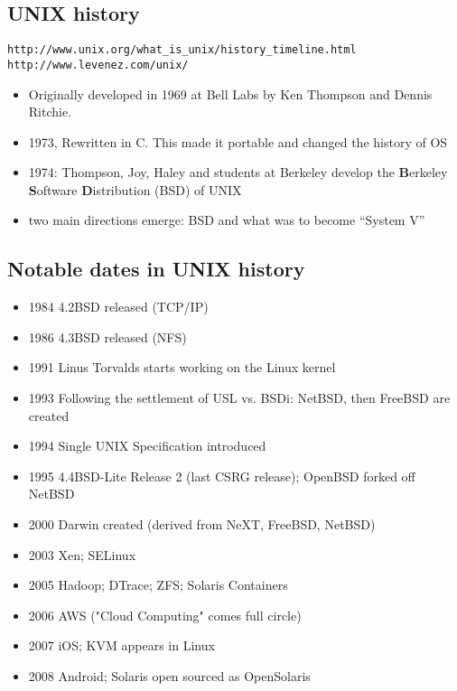 \documentclass[xga]{xdvislides}
\begin{document}
\subsection{UNIX history}
\verb+http://www.unix.org/what_is_unix/history_timeline.html+ \\

\verb+http://www.levenez.com/unix/+
\\

\begin{itemize}
	\item Originally developed in 1969 at Bell Labs by Ken Thompson
		and Dennis Ritchie.
	\item 1973, Rewritten in C. This made it portable and changed the history of OS
	\item 1974: Thompson, Joy, Haley and students at Berkeley develop
		the {\bf B}erkeley {\bf S}oftware {\bf D}istribution (BSD) of UNIX
	\item two main directions emerge: BSD and what was to become ``System V''
\end{itemize}

\subsection{Notable dates in UNIX history}
\begin{itemize}
	\item 1984 4.2BSD released (TCP/IP)
	\item 1986 4.3BSD released (NFS)
	\item 1991 Linus Torvalds starts working on the Linux kernel
	\item 1993 Following the settlement of USL vs. BSDi: NetBSD, then FreeBSD are created
	\item 1994 Single UNIX Specification introduced
	\item 1995 4.4BSD-Lite Release 2 (last CSRG release); OpenBSD
		forked off NetBSD
	\item 2000 Darwin created (derived from NeXT, FreeBSD, NetBSD)
	\item 2003 Xen; SELinux
	\item 2005 Hadoop; DTrace; ZFS; Solaris Containers
	\item 2006 AWS ("Cloud Computing" comes full circle)
	\item 2007 iOS; KVM appears in Linux
	\item 2008 Android; Solaris open sourced as OpenSolaris
\end{itemize}
\end{document}
